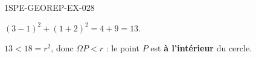 \begin{corrige}{1SPE-GEOREP-EX-028}

$(3 - 1)^2 + (1 + 2)^2 = 4 + 9 = 13$.

$13 < 18 = r^2$, donc $\Omega P < r$ : le point $P$ est \textbf{à l'intérieur} du cercle.

\end{corrige}
